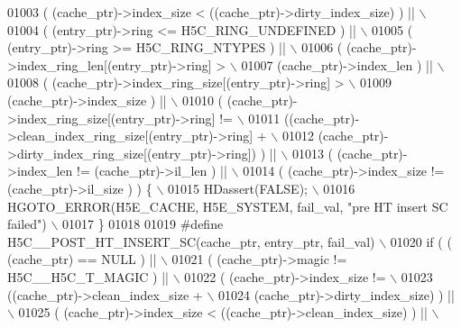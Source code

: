 \begin{DoxyCode}
01003 \textcolor{preprocessor}{     ( (cache\_ptr)->index\_size < ((cache\_ptr)->dirty\_index\_size) ) ||   \(\backslash\)}
01004 \textcolor{preprocessor}{     ( (entry\_ptr)->ring <= H5C\_RING\_UNDEFINED ) ||                     \(\backslash\)}
01005 \textcolor{preprocessor}{     ( (entry\_ptr)->ring >= H5C\_RING\_NTYPES ) ||                        \(\backslash\)}
01006 \textcolor{preprocessor}{     ( (cache\_ptr)->index\_ring\_len[(entry\_ptr)->ring] >                 \(\backslash\)}
01007 \textcolor{preprocessor}{       (cache\_ptr)->index\_len ) ||                                      \(\backslash\)}
01008 \textcolor{preprocessor}{     ( (cache\_ptr)->index\_ring\_size[(entry\_ptr)->ring] >                \(\backslash\)}
01009 \textcolor{preprocessor}{       (cache\_ptr)->index\_size ) ||                                     \(\backslash\)}
01010 \textcolor{preprocessor}{     ( (cache\_ptr)->index\_ring\_size[(entry\_ptr)->ring] !=               \(\backslash\)}
01011 \textcolor{preprocessor}{       ((cache\_ptr)->clean\_index\_ring\_size[(entry\_ptr)->ring] +         \(\backslash\)}
01012 \textcolor{preprocessor}{        (cache\_ptr)->dirty\_index\_ring\_size[(entry\_ptr)->ring]) ) ||     \(\backslash\)}
01013 \textcolor{preprocessor}{     ( (cache\_ptr)->index\_len != (cache\_ptr)->il\_len ) ||               \(\backslash\)}
01014 \textcolor{preprocessor}{     ( (cache\_ptr)->index\_size != (cache\_ptr)->il\_size ) ) \{            \(\backslash\)}
01015 \textcolor{preprocessor}{    HDassert(FALSE);                                                    \(\backslash\)}
01016 \textcolor{preprocessor}{    HGOTO\_ERROR(H5E\_CACHE, H5E\_SYSTEM, fail\_val, "pre HT insert SC failed") \(\backslash\)}
01017 \textcolor{preprocessor}{\}}
01018 
01019 \textcolor{preprocessor}{#define H5C\_\_POST\_HT\_INSERT\_SC(cache\_ptr, entry\_ptr, fail\_val)          \(\backslash\)}
01020 \textcolor{preprocessor}{if ( ( (cache\_ptr) == NULL ) ||                                         \(\backslash\)}
01021 \textcolor{preprocessor}{     ( (cache\_ptr)->magic != H5C\_\_H5C\_T\_MAGIC ) ||                      \(\backslash\)}
01022 \textcolor{preprocessor}{     ( (cache\_ptr)->index\_size !=                                       \(\backslash\)}
01023 \textcolor{preprocessor}{       ((cache\_ptr)->clean\_index\_size +                                 \(\backslash\)}
01024 \textcolor{preprocessor}{    (cache\_ptr)->dirty\_index\_size) ) ||                             \(\backslash\)}
01025 \textcolor{preprocessor}{     ( (cache\_ptr)->index\_size < ((cache\_ptr)->clean\_index\_size) ) ||   \(\backslash\)}

\end{DoxyCode}
